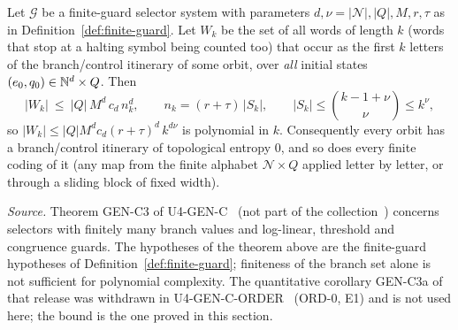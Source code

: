 \begin{theorem}\label{thm:E}
Let $\mathcal G$ be a finite-guard selector system with parameters $d,\nu=|\mathcal N|,|Q|,M,r,\tau$ as in Definition~\ref{def:finite-guard}. Let $W_k$ be the set of all words of length $k$ (words that stop at a halting symbol being counted too) that occur as the first $k$ letters of the branch/control itinerary of some orbit, over \emph{all} initial states $(e_0,q_0)\in\mathbb{N}^d\times Q$. Then
\[
|W_k|\ \le\ |Q|\,M^d\,c_d\,n_k^d,\qquad n_k=(r+\tau)\,|S_k|,\qquad |S_k|\le\binom{k-1+\nu}{\nu}\le k^\nu,
\]
so $|W_k|\le |Q|M^dc_d(r+\tau)^d\,k^{d\nu}$ is polynomial in $k$. Consequently every orbit has a branch/control itinerary of topological entropy $0$, and so does every finite coding of it (any map from the finite alphabet $\mathcal N\times Q$ applied letter by letter, or through a sliding block of fixed width).
\end{theorem}
\noindent\emph{Source.} Theorem GEN-C3 of U4-GEN-C~\cite{u4genc} (not part of the collection~\cite{coll}) concerns selectors with finitely many branch values and log-linear, threshold and congruence guards. The hypotheses of the theorem above are the finite-guard hypotheses of Definition~\ref{def:finite-guard}; finiteness of the branch set alone is not sufficient for polynomial complexity. The quantitative corollary GEN-C3a of that release was withdrawn in U4-GEN-C-ORDER~\cite{u4order} (ORD-0, E1) and is not used here; the bound is the one proved in this section.
